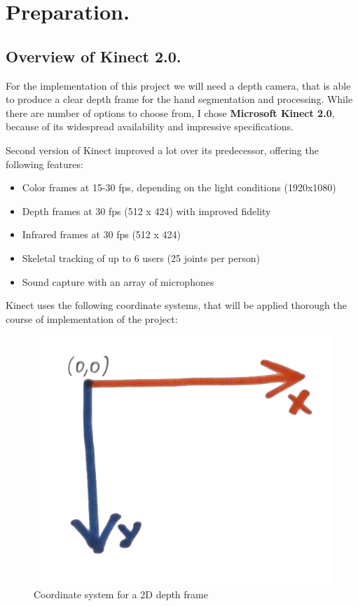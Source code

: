 \documentclass[a4paper,11pt,oneside]{article}
\begin{document}
\section{Preparation.}

\subsection{Overview of Kinect 2.0.}

For the implementation of this project we will need a depth camera, that is able to produce a clear depth frame for the hand segmentation and processing. While there are number of options to choose from, I chose \textbf{Microsoft Kinect 2.0}, because of its widespread availability and impressive specifications.

Second version of Kinect improved a lot over its predecessor, offering the following features:

\begin{itemize}
\item Color frames at 15-30 fps, depending on the light conditions (1920x1080)
\item Depth frames at 30 fps (512 x 424) with improved fidelity
\item Infrared frames at 30 fps (512 x 424)
\item Skeletal tracking of up to 6 users (25 joints per person)
\item Sound capture with an array of microphones
\end{itemize}

Kinect uses the following coordinate systems, that will be applied thorough the course of implementation of the project:

\begin{figure}[H]
\centering
\includegraphics[scale=0.4]{coordinate-2d.png}
\caption{Coordinate system for a 2D depth frame}
\end{figure}
\end{document}
